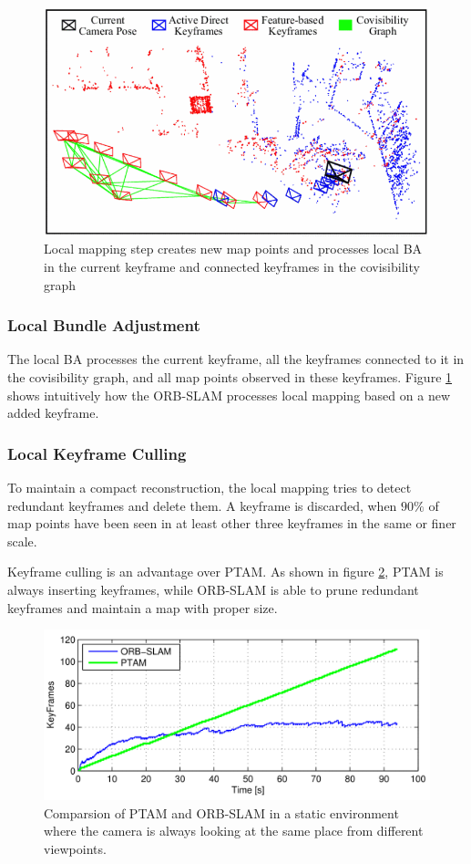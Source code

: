 \documentclass[letterpaper, 10 pt, conference]{ieeeconf}  %
\begin{document}
%
\begin{figure}[!htbp]%
\centering
\includegraphics[scale=0.3]{./images/local_mapping}
\caption{Local mapping step creates new map points and processes local BA in the current keyframe and connected keyframes in the covisibility graph}
\label{Local mapping}
\end{figure}
%

\subsubsection{Local Bundle Adjustment}
The local BA processes the current keyframe, all the keyframes connected to it in the covisibility graph, and all map points observed in these keyframes. Figure \ref{Local mapping} shows intuitively how the ORB-SLAM processes local mapping based on a new added keyframe.

\subsubsection{Local Keyframe Culling}
To maintain a compact reconstruction, the local mapping tries to detect redundant keyframes and delete them. A keyframe is discarded, when $90\%$ of map points have been seen in at least other three keyframes in the same or
finer scale.

Keyframe culling is an advantage over PTAM. As shown in figure \ref{KF_culling}, PTAM is always inserting keyframes, while ORB-SLAM is able to prune redundant keyframes and maintain a map with proper size. 
%
\begin{figure}[!htbp]%
\centering
\includegraphics[scale=0.18]{./images/PTAM_ORB_KF_CULLING}
\caption{Comparsion of PTAM and ORB-SLAM in a static environment where the camera is always looking at the same place from different viewpoints.}
\label{KF_culling}
\end{figure}
%
\end{document}

